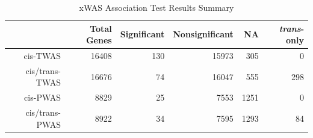 \begin{table}[H]
\centering
\caption{xWAS Association Test Results Summary} 
\label{tab:summary}
\begin{tabular}{rrrrrr}
  \toprule
 & Total Genes & Significant & Nonsignificant & NA & \textit{trans}-only \\ 
  \midrule
cis-TWAS & 16408 & 130 & 15973 & 305 &   0 \\ 
  cis/trans-TWAS & 16676 &  74 & 16047 & 555 & 298 \\ 
  cis-PWAS & 8829 &  25 & 7553 & 1251 &   0 \\ 
  cis/trans-PWAS & 8922 &  34 & 7595 & 1293 &  84 \\ 
   \bottomrule
\end{tabular}
\end{table}
